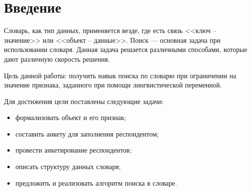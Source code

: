 
\chapter*{Введение}

Словарь, как тип данных, применяется везде, где есть связь <<ключ -- значение>> или <<объект -- данные>>. Поиск --- основная задача при использовании словаря. Данная задача решается различными способами, которые дают различную скорость решения.

Цель данной работы: получить навык поиска по словарю при ограничении на значение признака, заданного при помощи лингвистической переменной.

Для достижения цели поставлены следующие задачи:
\begin{itemize}[label=---]
	\item формализовать объект и его признак;
	\item составить анкету для заполнения респондентом;
	\item провести анкетирование респондентов;
	\item описать структуру данных словаря;
	\item предложить и реализовать алгоритм поиска в словаре.
\end{itemize}
